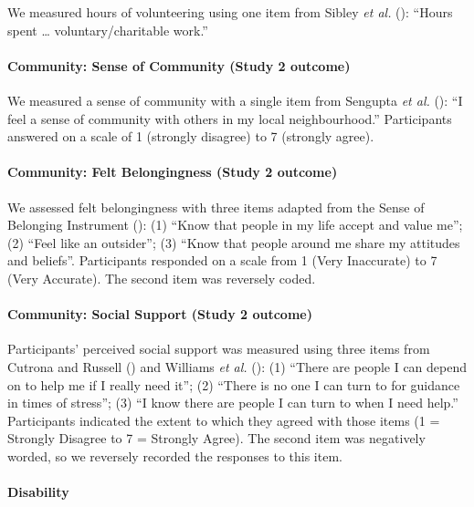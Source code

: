 \documentclass[
  singlecolumn]{article}
\let\oldparagraph\paragraph
\renewcommand{\paragraph}[1]{\oldparagraph{#1}\mbox{}}
\begin{document}
We measured hours of volunteering using one item from Sibley \emph{et
al.} (): ``Hours spent \ldots{}
voluntary/charitable work.''

\paragraph{Community: Sense of Community (Study 2
outcome)}\label{community-sense-of-community-study-2-outcome}

We measured a sense of community with a single item from Sengupta
\emph{et al.} (): ``I feel a sense of
community with others in my local neighbourhood.'' Participants answered
on a scale of 1 (strongly disagree) to 7 (strongly agree).

\paragraph{Community: Felt Belongingness (Study 2
outcome)}\label{community-felt-belongingness-study-2-outcome}

We assessed felt belongingness with three items adapted from the Sense
of Belonging Instrument (): (1) ``Know that people in my life accept and value me''; (2)
``Feel like an outsider''; (3) ``Know that people around me share my
attitudes and beliefs''. Participants responded on a scale from 1 (Very
Inaccurate) to 7 (Very Accurate). The second item was reversely coded.

\paragraph{Community: Social Support (Study 2
outcome)}\label{community-social-support-study-2-outcome}

Participants' perceived social support was measured using three items
from Cutrona and Russell () and Williams
\emph{et al.} (): (1)
``There are people I can depend on to help me if I really need it''; (2)
``There is no one I can turn to for guidance in times of stress''; (3)
``I know there are people I can turn to when I need help.'' Participants
indicated the extent to which they agreed with those items (1 = Strongly
Disagree to 7 = Strongly Agree). The second item was negatively worded,
so we reversely recorded the responses to this item.

\paragraph{Disability}\label{disability}
\end{document}
